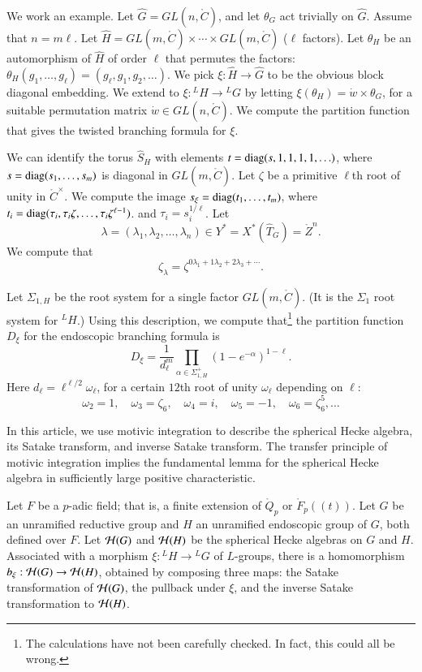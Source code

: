 We work an example.
Let $\hat G = GL(n,\ring{C})$, and let $\theta_G$ act trivially on $\hat G$.
Assume that $n=m \ell$. 
Let $\hat H = GL(m,\ring{C})\times \cdots\times GL(m,\ring{C})$ ($\ell$ factors).
Let $\theta_H$ be an automorphism of $\hat H$ of order $\ell$ that permutes the factors:
$\theta_H(g_1,\ldots,g_\ell) = (g_\ell,g_1,g_2,\ldots)$.
We pick $\xi:\hat H\to \hat G$ to be the obvious block diagonal embedding.  We extend
to $\xi:{}^LH\to {}^LG$ by letting $\xi(\theta_H) = \dot w\times \theta_G$, for a suitable permutation
matrix $\dot w\in GL(n,\ring{C})$. We compute the partition function that gives the twisted branching formula for $\xi$.

We can identify the torus $\hat S_H$ with elements $t={\operatorname{diag}}(s,1,1,1,1,\ldots)$, where 
$s={\operatorname{diag}}(s_1,\ldots,s_m)$ is diagonal in
$GL(m,\ring{C})$.  Let $\zeta$ be a primitive $\ell$th root of unity in $\ring{C}^\times$.
We compute the image $s_\xi = {\operatorname{diag}}(t_1,\ldots,t_m)$, 
where $t_i = {\operatorname{diag}}(\tau_i,\tau_i \zeta,\ldots, \tau_i \zeta^{\ell-1})$.  
and $\tau_i = s_i^{1/\ell}$.
Let 
\[
\lambda = (\lambda_1,\lambda_2,\ldots,\lambda_n)\in Y^* = X^*(\hat T_G) = \ring{Z}^n.
\]
We compute that
\[
\zeta_\lambda = \zeta^{0\lambda_1+1\lambda_2+2\lambda_3+\cdots}.
\]

Let $\Sigma_{1,H}$ be the root system for a single factor $GL(m,\ring{C})$.  (It is the $\Sigma_1$ root
system for ${}^LH$.)
Using this description, we compute that\footnote{The calculations have not been carefully checked. In fact, this
could all be wrong.} 
the partition function $D_{\xi}$ for the endoscopic branching
formula is
\[
D_\xi=\frac{1}{d_{\ell}^m} \prod_{\alpha\in\Sigma^+_{1,H}} (1-e^{-\alpha})^{1-\ell}.
\]
Here $d_\ell = \ell^{\ell/2} \omega_\ell$, for a certain $12$th root of unity $\omega_\ell$ depending on $\ell$:
\[
\omega_2 = 1,\quad \omega_3 = \zeta_6,\quad \omega_4 = i,\quad \omega_5 = -1,\quad \omega_6 = \zeta_6^5,
\ldots
\]



\newpage

In this article, we use motivic integration to describe the spherical
Hecke algebra, its Satake transform, and inverse Satake transform.
The transfer principle of motivic integration implies the fundamental
lemma for the spherical Hecke algebra in sufficiently large positive characteristic.

Let $F$ be a $p$-adic field; that is, a finite extension of $\ring{Q}_p$ or $\ring{F}_p((t))$.
Let $G$ be an unramified reductive group and $H$ an unramified endoscopic group of $G$, both defined over $F$.
Let $\mathcal H(G)$ and $\mathcal H(H)$ be the spherical Hecke algebras on $G$ and $H$.
Associated with  a morphism $\xi:{}^LH\to {}^LG$ of $L$-groups, there is a homomorphism
$b_\xi:\mathcal H(G)\to \mathcal H(H)$, obtained by composing three maps: the Satake transformation of $\mathcal H(G)$,
the pullback under $\xi$, and the inverse Satake transformation to $\mathcal H(H)$.

